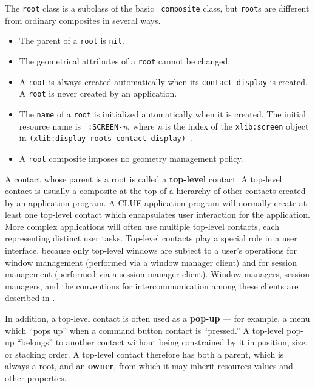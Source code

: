 The {\tt root} class is a subclass of the basic {\tt
composite} class,
but {\tt root}s are different from ordinary composites in several ways.
\begin{itemize}
\item The parent of a {\tt root} is {\tt nil}.
\item The geometrical attributes of a {\tt root} cannot be changed.
\item A {\tt root} is always created automatically when its
{\tt contact-display} is created. A {\tt root} is never created by an
application.  \item The {\tt name} of a {\tt root} is
initialized automatically when it is created.  The initial resource name is {\tt
:SCREEN-}{\em n}, where {\em n} is the index of the
{\tt xlib:screen} object in {\tt (xlib:display-roots
contact-display)}~\footnotemark{}.
\item A {\tt root} composite imposes no geometry management policy.
\end{itemize}




A contact whose parent is a root is called a {\bf
top-level} contact.  A top-level contact is usually
a composite at the top of a hierarchy
of other contacts created by an application program.  A CLUE application program
will
normally create at least one top-level contact which encapsulates user
interaction for the application.  More complex applications will often use multiple
top-level contacts, each representing distinct user tasks.  Top-level contacts
play a special role in a user interface, because only top-level windows are
subject to a user's operations for window management (performed via a window
manager client) and for session management (performed via a session manager
client).  Window managers, session managers, and the conventions for
intercommunication among these clients are described in \cite{icccm}.

In addition, a top-level contact is often used as a {\bf pop-up}
--- for example, a menu which ``pops up'' when a command button contact is
``pressed.'' A top-level pop-up ``belongs'' to another contact without being
constrained by it in position, size, or stacking order.  A top-level contact
therefore has both a parent, which is always a root, and an {\bf
owner}, from which it may inherit resources
values and other properties.

